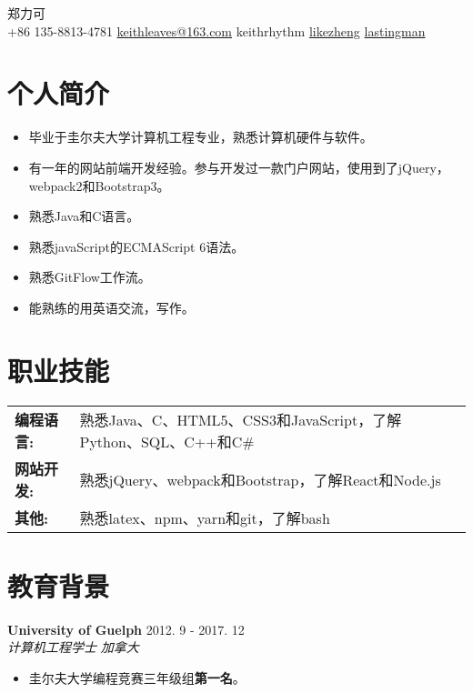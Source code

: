 \documentclass[10pt, letterpaper]{article}
\makeatletter
\newcommand*{\nametitle}[1]{{\fontsize{32pt}{1em}\color{awesome-emerald} #1 \\[0.6\baselineskip]}}
\newcommand*{\subinfo}[2]{\hspace{5pt} {\color{darktext}#1} \hspace*{2pt} {\color{lighttext}#2} \hspace{5pt}}
\newcommand{\information}[4]{
	\noindent
    \textbf{\color{darktext}#1} \hfill {#2} \\
    \textit{\color{hardtext}#3} \hfill \textit{\color{awesome-emerald}#4}
}
\newenvironment{skills}{
    \noindent
    \begin{tabular}{@{}l l@{}}
}{
    \end{tabular}
}
\newcommand*{\skill}[2]{
	\textbf{\color{darktext}#1} & {#2} \\
}
\makeatother
\begin{document}
\begin{center}
\nametitle{郑力可}
\subinfo{\faPhoneSquare}{+86 135-8813-4781}
\subinfo{\faEnvelope}{\href{mailto: keithleaves@163.com}{keithleaves@163.com}}
\subinfo{\faWechat}{keithrhythm}
\subinfo{\faLinkedinSquare}{\href{https://www.linkedin.com/in/likezheng/}{likezheng}}
\subinfo{\faGithub}{\href{https://github.com/lastingman}{lastingman}}
\end{center}


\color{lighttext}

\section*{个人简介}
\noindent
\begin{itemize}[leftmargin=*]
    \item 毕业于圭尔夫大学计算机工程专业，熟悉计算机硬件与软件。
    \item 有一年的网站前端开发经验。参与开发过一款门户网站，使用到了jQuery，webpack2和Bootstrap3。
    \item 熟悉Java和C语言。
    \item 熟悉javaScript的ECMAScript 6语法。
    \item 熟悉GitFlow工作流。
    \item 能熟练的用英语交流，写作。
\end{itemize}

\section*{职业技能}
\begin{skills}
\skill{编程语言:}{熟悉Java、C、HTML5、CSS3和JavaScript，了解Python、SQL、C++和C\#}
\skill{网站开发:}{熟悉jQuery、webpack和Bootstrap，了解React和Node.js}
\skill{其他:}{熟悉latex、npm、yarn和git，了解bash}
\end{skills}

\section*{教育背景}

\information
	{University of Guelph}{2012. 9 - 2017. 12}
	{计算机工程学士}{加拿大}
\begin{itemize}[leftmargin=*]
\item 圭尔夫大学编程竞赛三年级组\textbf{第一名}。
\end{itemize}
\end{document}

